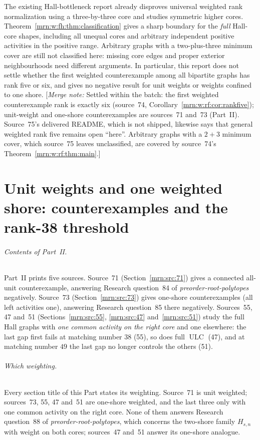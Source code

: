 \documentclass[11pt,a4paper]{article}
\theoremstyle{remark}\newtheorem{remark}[theorem]{Remark}
\newcommand{\ULC}{\operatorname{ULC}}      %
\newcommand{\mnote}[1]{[\textit{Merge note:} #1]}
\newcommand{\prp}{\emph{preorder-root-polytopes}}
\begin{document}
The existing Hall-bottleneck report \cite{b:HallMS} already disproves universal weighted rank normalization using a three-by-three core and studies symmetric higher cores. Theorem~\ref{mrn:w:fh:thm:classification} gives a sharp boundary for the \emph{full} Hall-core shapes, including all unequal cores and arbitrary independent positive activities in the positive range. Arbitrary graphs with a two-plus-three minimum cover are still not classified here: missing core edges and proper exterior neighbourhoods need different arguments. In particular, this report does not settle whether the first weighted counterexample among all bipartite graphs has rank five or six, and gives no negative result for unit weights or weights confined to one shore.
\mnote{Settled within the batch: the first weighted counterexample rank is exactly six (source~74, Corollary~\ref{mrn:w:rf:cor:rankfive}); unit-weight and one-shore counterexamples are sources~71 and~73 (Part~II). Source~75's delivered README, which is not shipped, likewise says that general weighted rank five remains open ``here''. Arbitrary graphs with a $2+3$ minimum cover, which source~75 leaves unclassified, are covered by source~74's Theorem~\ref{mrn:w:rf:thm:main}.}

\clearpage
\part{Unit weights and one weighted shore: counterexamples and the rank-38 threshold}\label{mrn:part:two}

\paragraph{Contents of Part~II.}
Part~II prints five sources. Source~71 (Section~\ref{mrn:src:71}) gives a
connected all-unit counterexample, answering Research question~84 of \prp{}
negatively. Source~73 (Section~\ref{mrn:src:73}) gives one-shore
counterexamples (all left activities one), answering Research question~85
there negatively. Sources~55, 47 and~51 (Sections~\ref{mrn:src:55},
\ref{mrn:src:47} and~\ref{mrn:src:51}) study the full Hall graphs with
\emph{one common activity on the right core} and one elsewhere: the last gap
first fails at matching number $38$ (55), so does full $\ULC$ (47), and at
matching number $49$ the last gap no longer controls the others (51).

\paragraph{Which weighting.}
Every section title of this Part states its weighting. Source~71 is unit
weighted; sources~73, 55, 47 and~51 are one-shore weighted, and the last
three only with one common activity on the right core. None of them answers
Research question~88 of \prp, which concerns the two-shore family $H_{s,n}$
with weight on both cores; sources~47 and~51 answer its one-shore analogue.
\end{document}
